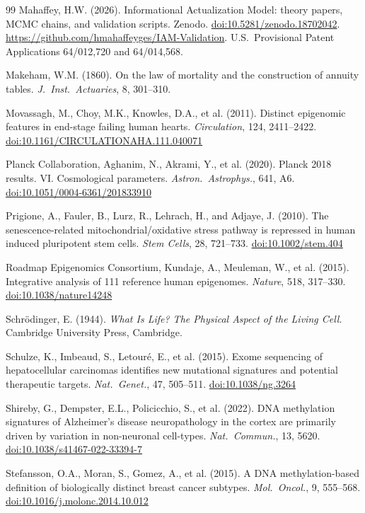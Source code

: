 \documentclass[12pt,a4paper]{article}
\newcommand{\doi}[1]{\href{https://doi.org/#1}{doi:#1}}
\begin{document}
\begin{thebibliography}{99}
Mahaffey, H.W. (2026).
Informational Actualization Model: theory papers, MCMC chains, and validation scripts.
Zenodo. \doi{10.5281/zenodo.18702042}.
\url{https://github.com/hmahaffeyges/IAM-Validation}.
U.S.\ Provisional Patent Applications 64/012,720 and 64/014,568.

Makeham, W.M. (1860).
On the law of mortality and the construction of annuity tables.
\textit{J.\ Inst.\ Actuaries}, 8, 301--310.

Movassagh, M., Choy, M.K., Knowles, D.A., et al. (2011).
Distinct epigenomic features in end-stage failing human hearts.
\textit{Circulation}, 124, 2411--2422.
\doi{10.1161/CIRCULATIONAHA.111.040071}

Planck Collaboration, Aghanim, N., Akrami, Y., et al. (2020).
Planck 2018 results. VI. Cosmological parameters.
\textit{Astron.\ Astrophys.}, 641, A6.
\doi{10.1051/0004-6361/201833910}

Prigione, A., Fauler, B., Lurz, R., Lehrach, H., and Adjaye, J. (2010).
The senescence-related mitochondrial/oxidative stress pathway is repressed in human induced pluripotent stem cells.
\textit{Stem Cells}, 28, 721--733.
\doi{10.1002/stem.404}

Roadmap Epigenomics Consortium, Kundaje, A., Meuleman, W., et al. (2015).
Integrative analysis of 111 reference human epigenomes.
\textit{Nature}, 518, 317--330.
\doi{10.1038/nature14248}

Schr\"odinger, E. (1944).
\textit{What Is Life? The Physical Aspect of the Living Cell}.
Cambridge University Press, Cambridge.

Schulze, K., Imbeaud, S., Letour\'e, E., et al. (2015).
Exome sequencing of hepatocellular carcinomas identifies new mutational signatures and potential therapeutic targets.
\textit{Nat.\ Genet.}, 47, 505--511.
\doi{10.1038/ng.3264}

Shireby, G., Dempster, E.L., Policicchio, S., et al. (2022).
DNA methylation signatures of Alzheimer's disease neuropathology in the cortex are primarily driven by variation in non-neuronal cell-types.
\textit{Nat.\ Commun.}, 13, 5620.
\doi{10.1038/s41467-022-33394-7}

Stefansson, O.A., Moran, S., Gomez, A., et al. (2015).
A DNA methylation-based definition of biologically distinct breast cancer subtypes.
\textit{Mol.\ Oncol.}, 9, 555--568.
\doi{10.1016/j.molonc.2014.10.012}


\end{thebibliography}
\end{document}
